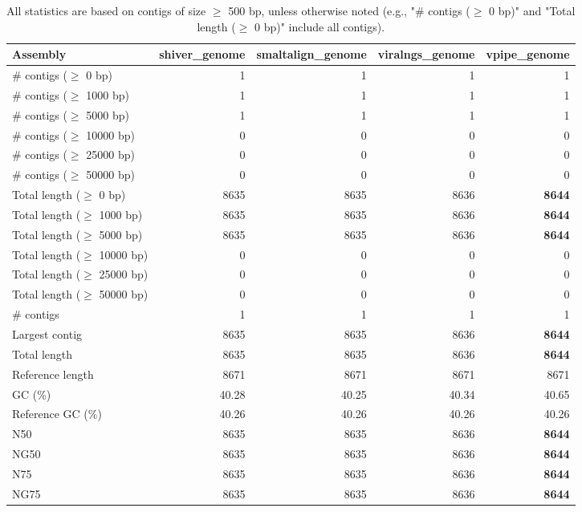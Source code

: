 \documentclass[12pt,a4paper]{article}
\begin{document}
\begin{table}[ht]
\begin{center}
\caption{All statistics are based on contigs of size $\geq$ 500 bp, unless otherwise noted (e.g., "\# contigs ($\geq$ 0 bp)" and "Total length ($\geq$ 0 bp)" include all contigs).}
\begin{tabular}{|l*{4}{|r}|}
\hline
Assembly & shiver\_genome & smaltalign\_genome & viralngs\_genome & vpipe\_genome \\ \hline
\# contigs ($\geq$ 0 bp) & 1 & 1 & 1 & 1 \\ \hline
\# contigs ($\geq$ 1000 bp) & 1 & 1 & 1 & 1 \\ \hline
\# contigs ($\geq$ 5000 bp) & 1 & 1 & 1 & 1 \\ \hline
\# contigs ($\geq$ 10000 bp) & 0 & 0 & 0 & 0 \\ \hline
\# contigs ($\geq$ 25000 bp) & 0 & 0 & 0 & 0 \\ \hline
\# contigs ($\geq$ 50000 bp) & 0 & 0 & 0 & 0 \\ \hline
Total length ($\geq$ 0 bp) & 8635 & 8635 & 8636 & {\bf 8644} \\ \hline
Total length ($\geq$ 1000 bp) & 8635 & 8635 & 8636 & {\bf 8644} \\ \hline
Total length ($\geq$ 5000 bp) & 8635 & 8635 & 8636 & {\bf 8644} \\ \hline
Total length ($\geq$ 10000 bp) & 0 & 0 & 0 & 0 \\ \hline
Total length ($\geq$ 25000 bp) & 0 & 0 & 0 & 0 \\ \hline
Total length ($\geq$ 50000 bp) & 0 & 0 & 0 & 0 \\ \hline
\# contigs & 1 & 1 & 1 & 1 \\ \hline
Largest contig & 8635 & 8635 & 8636 & {\bf 8644} \\ \hline
Total length & 8635 & 8635 & 8636 & {\bf 8644} \\ \hline
Reference length & 8671 & 8671 & 8671 & 8671 \\ \hline
GC (\%) & 40.28 & 40.25 & 40.34 & 40.65 \\ \hline
Reference GC (\%) & 40.26 & 40.26 & 40.26 & 40.26 \\ \hline
N50 & 8635 & 8635 & 8636 & {\bf 8644} \\ \hline
NG50 & 8635 & 8635 & 8636 & {\bf 8644} \\ \hline
N75 & 8635 & 8635 & 8636 & {\bf 8644} \\ \hline
NG75 & 8635 & 8635 & 8636 & {\bf 8644} \\ \hline

\end{tabular}
\end{center}
\end{table}
\end{document}

